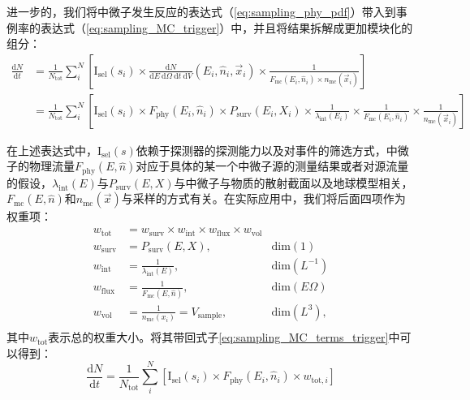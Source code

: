 进一步的，我们将中微子发生反应的表达式（\ref{eq:sampling_phy_pdf}）带入到事例率的表达式（\ref{eq:sampling_MC_trigger}）中，并且将结果拆解成更加模块化的组分：
\begin{equation}
\begin{aligned}
    \frac{\mathrm{d}N}{\mathrm{d}t} 
    &= \frac{1}{N_\mathrm{tot}} \sum^N_i \left[ \mathrm{I}_\mathrm{sel}(s_i) \times 
    \frac{\mathrm{d}N}{\mathrm{d}E ~\mathrm{d}\Omega ~\mathrm{d}t ~\mathrm{d}V} (E_i, \hat{n}_i, \vec{x}_i)
    \times \frac{1}{F_\mathrm{mc} (E_i, \hat{n}_i) \times n_\mathrm{mc}(\vec{x}_i)} \right] \\
    &= \frac{1}{N_\mathrm{tot}} \sum^N_i \left[ \mathrm{I}_\mathrm{sel}(s_i) \times 
    F_\mathrm{phy}(E_i, \hat{n}_i) \times
    P_\mathrm{surv}(E_i, X_i) \times
    \frac{1}{\lambda_\mathrm{int}(E_i)} \times
    \frac{1}{F_\mathrm{mc} (E_i, \hat{n}_i)} \times
    \frac{1}{n_\mathrm{mc}(\vec{x}_i)} \right]
\end{aligned}
\label{eq:sampling_MC_terms_trigger}
\end{equation}

在上述表达式中，$\mathrm{I}_\mathrm{sel}(s)$依赖于探测器的探测能力以及对事件的筛选方式，中微子的物理流量$F_\mathrm{phy}(E, \hat{n})$对应于具体的某一个中微子源的测量结果或者对源流量的假设，$\lambda_\mathrm{int}(E)$与$P_\mathrm{surv}(E, X)$与中微子与物质的散射截面以及地球模型相关，$F_\mathrm{mc} (E, \hat{n})$和$n_\mathrm{mc}(\vec{x})$与采样的方式有关。在实际应用中，我们将后面四项作为权重项：
\begin{equation}
\begin{aligned}
    w_\mathrm{tot} &= w_\mathrm{surv} \times w_\mathrm{int} \times w_\mathrm{flux} \times w_\mathrm{vol} \\
    w_\mathrm{surv} &= P_\mathrm{surv}(E, X), &\mathrm{dim}(1) \\
    w_\mathrm{int} &= \frac{1}{\lambda_\mathrm{int}(E)}, &\mathrm{dim}(L^{-1}) \\
    w_\mathrm{flux} &= \frac{1}{F_\mathrm{mc}(E, \hat{n})},  &\mathrm{dim}(E \Omega) \\
    w_\mathrm{vol} &= \frac{1}{n_\mathrm{mc}(x_i)} = V_\mathrm{sample}, &\mathrm{dim}(L^{3}) ,\\
\end{aligned}
\label{eq:weighting_terms}
\end{equation}
其中$w_\mathrm{tot}$表示总的权重大小。将其带回式子\ref{eq:sampling_MC_terms_trigger}中可以得到：
\begin{equation}
    \frac{\mathrm{d}N}{\mathrm{d}t} = 
    \frac{1}{N_\mathrm{tot}} \sum^N_i \left[ 
    \mathrm{I}_\mathrm{sel}(s_i) \times 
    F_\mathrm{phy} (E_i, \hat{n}_i) \times
    w_{\mathrm{tot}, i} \right]
\label{eq:sampling_trigger_rate}
\end{equation}

